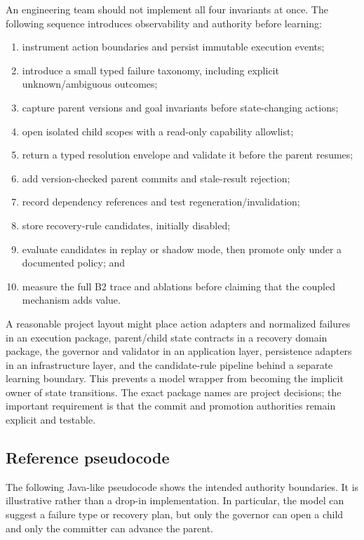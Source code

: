 An engineering team should not implement all four invariants at once. The following sequence introduces observability and authority before learning:

\begin{enumerate}
  \item instrument action boundaries and persist immutable execution events;
  \item introduce a small typed failure taxonomy, including explicit unknown/ambiguous outcomes;
  \item capture parent versions and goal invariants before state-changing actions;
  \item open isolated child scopes with a read-only capability allowlist;
  \item return a typed resolution envelope and validate it before the parent resumes;
  \item add version-checked parent commits and stale-result rejection;
  \item record dependency references and test regeneration/invalidation;
  \item store recovery-rule candidates, initially disabled;
  \item evaluate candidates in replay or shadow mode, then promote only under a documented policy; and
  \item measure the full B2 trace and ablations before claiming that the coupled mechanism adds value.
\end{enumerate}

A reasonable project layout might place action adapters and normalized failures in an execution package, parent/child state contracts in a recovery domain package, the governor and validator in an application layer, persistence adapters in an infrastructure layer, and the candidate-rule pipeline behind a separate learning boundary. This prevents a model wrapper from becoming the implicit owner of state transitions. The exact package names are project decisions; the important requirement is that the commit and promotion authorities remain explicit and testable.

\subsection{Reference pseudocode}
\label{subsec:ch13-pseudocode}

The following Java-like pseudocode shows the intended authority boundaries. It is illustrative rather than a drop-in implementation. In particular, the model can suggest a failure type or recovery plan, but only the governor can open a child and only the committer can advance the parent.

